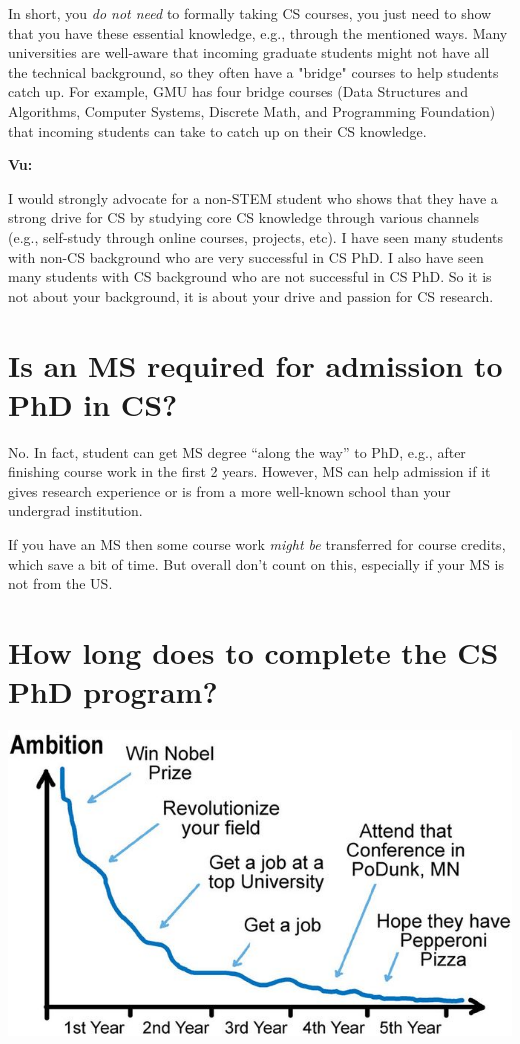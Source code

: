 \documentclass[oneside,11pt,dvipsnames]{book}
\newenvironment{commentbox}[1][]{
  \small
  \begin{mybox}
    {\small \textbf{#1}}
  }{
  \end{mybox}
}
\begin{document}
In short, you \emph{do not need} to formally taking CS courses, you just need to show that you have these essential knowledge, e.g., through the mentioned ways. Many universities are well-aware that incoming graduate students might not have all the technical background, so they often have a "bridge" courses to help students catch up.  For example, GMU has four bridge courses (Data Structures and Algorithms, Computer Systems, Discrete Math, and Programming Foundation) that incoming students can take to catch up on their CS knowledge.

\begin{commentbox}[Vu:]
  I would strongly advocate for a non-STEM student who shows that they have a strong drive for CS by studying core CS knowledge through various channels (e.g., self-study through online courses, projects, etc).  I have seen many students with non-CS background who are very successful in CS PhD.  I also have seen many students with CS background who are not successful in CS PhD.  So it is not about your background, it is about your drive and passion for CS research.
\end{commentbox}

\section{Is an MS required for admission to PhD in CS?}\label{sec:msrequirement}
No. In fact, student can get MS degree ``along the way'' to PhD, e.g., after finishing course work in the first 2 years.  However, MS can help admission if it gives research experience or is from a more well-known school than your undergrad institution.

If you have an MS then some course work \emph{might be} transferred for course credits, which save a bit of time. But overall don't count on this, especially if your MS is not from the US.


\section{How long does to complete the CS PhD program?}\label{sec:time}


\begin{center}
  \includegraphics[scale=0.5]{files/c4a.png}
\end{center}
\end{document}
